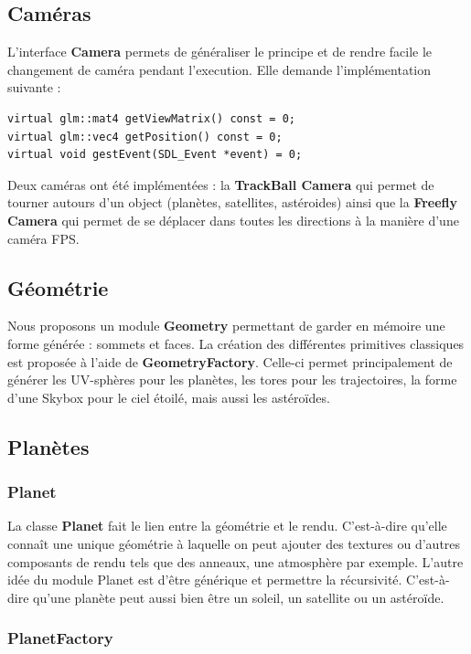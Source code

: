 \documentclass[11pt,a4paper]{article}
\begin{document}
\subsection{Caméras}
L'interface \textbf{Camera} permets de généraliser le principe et de rendre facile le changement de caméra pendant l'execution. Elle demande l'implémentation suivante :
\begin{lstlisting}
virtual glm::mat4 getViewMatrix() const = 0;
virtual glm::vec4 getPosition() const = 0;
virtual void gestEvent(SDL_Event *event) = 0;
\end{lstlisting}
Deux caméras ont été implémentées : la \textbf{TrackBall Camera} qui permet de tourner autours d'un object (planètes, satellites, astéroides) ainsi que la \textbf{Freefly Camera} qui permet de se déplacer dans toutes les directions à la manière d'une caméra FPS.

\subsection{Géométrie}

Nous proposons un module \textbf{Geometry} permettant de garder en mémoire une forme générée : sommets et faces.
La création des différentes primitives classiques est proposée à l'aide de \textbf{GeometryFactory}. Celle-ci permet principalement de générer les UV-sphères pour les planètes, les tores pour les trajectoires, la forme d'une Skybox pour le ciel étoilé, mais aussi les astéroïdes.

\subsection{Planètes}
\subsubsection{Planet}

La classe \textbf{Planet} fait le lien entre la géométrie et le rendu. C'est-à-dire qu'elle connaît une unique géométrie à laquelle on peut ajouter des textures ou d'autres composants de rendu tels que des anneaux, une atmosphère par exemple.
L'autre idée du module Planet est d'être générique et permettre la récursivité. C'est-à-dire qu'une planète peut aussi bien être un soleil, un satellite ou un astéroïde.

\subsubsection{PlanetFactory}
\end{document}

